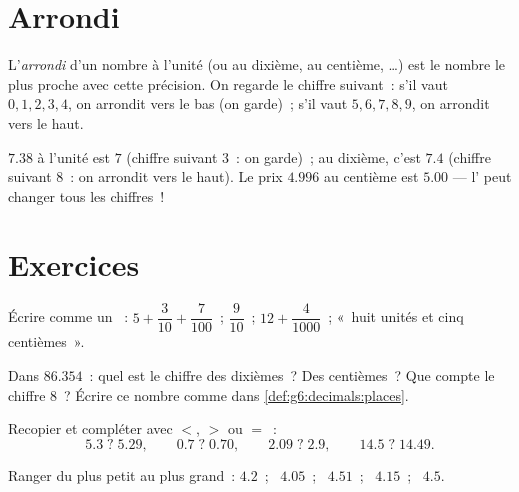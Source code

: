 \section{Arrondi}

\begin{definition}[Arrondi]\label{def:g6:decimals:rounding}
L'\emph{arrondi} d'un nombre à l'unité (ou au dixième,
au centième, \dots) est le nombre le plus proche avec cette
précision. On regarde le chiffre suivant~: s'il vaut $0,1,2,3,4$, on
arrondit vers le bas (on garde)~; s'il vaut $5,6,7,8,9$, on arrondit
vers le haut.
\end{definition}

\begin{example}
$7.38$  à l'unité est $7$ (chiffre suivant $3$~: on garde)~;
 au dixième, c'est $7.4$ (chiffre suivant $8$~: on arrondit
vers le haut). Le prix $4.996$  au centième est $5.00$ ---
l' peut changer tous les chiffres~!
\end{example}

\section{Exercices}

\begin{exercise}[$\star$]\label{exo:g6:decimals:1}
Écrire comme un ~: $5 + \dfrac{3}{10} + \dfrac{7}{100}$~;
\quad $\dfrac{9}{10}$~; \quad $12 + \dfrac{4}{1000}$~;
\quad «~huit unités et cinq centièmes~».
\end{exercise}

\begin{exercise}[$\star$]\label{exo:g6:decimals:2}
Dans $86.354$~: quel est le chiffre des dixièmes~? Des centièmes~?
Que compte le chiffre $8$~? Écrire ce nombre comme dans
\cref{def:g6:decimals:places}.
\end{exercise}

\begin{exercise}[$\star$]\label{exo:g6:decimals:3}
Recopier et compléter avec $<$, $>$ ou $=$~:
\[
5.3 \;?\; 5.29, \qquad
0.7 \;?\; 0.70, \qquad
2.09 \;?\; 2.9, \qquad
14.5 \;?\; 14.49 .
\]
\end{exercise}

\begin{exercise}[$\star$]\label{exo:g6:decimals:4}
Ranger du plus petit au plus grand~:
$4.2$~; \ $4.05$~; \ $4.51$~; \ $4.15$~; \ $4.5$.
\end{exercise}


